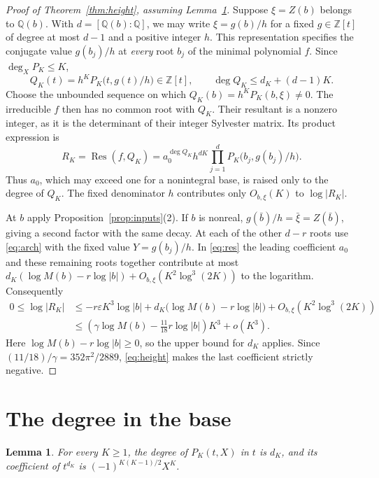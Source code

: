 \documentclass[11pt,letterpaper]{article}
\newtheorem{lemma}[theorem]{Lemma}
\numberwithin{equation}{section}
\newcommand{\Q}{\mathbb Q}
\newcommand{\Z}{\mathbb Z}
\begin{document}
\begin{proof}[Proof of Theorem~\ref{thm:height}, assuming Lemma~\ref{lem:degree}]
Suppose \(\xi=Z(b)\) belongs to \(\Q(b)\). With
\(d=[\Q(b):\Q]\), we may write \(\xi=g(b)/h\) for a fixed
\(g\in\Z[t]\) of degree at most \(d-1\) and a positive integer \(h\).
This representation specifies the conjugate value \(g(b_j)/h\) at
\emph{every} root \(b_j\) of the minimal polynomial \(f\).
Since \(\deg_X P_K\le K\),
\[
 Q_K(t)=h^K P_K\big(t,g(t)/h\big)\in\Z[t],\qquad
 \deg Q_K\le d_K+(d-1)K .
\]
Choose the unbounded sequence on which \(Q_K(b)=h^KP_K(b,\xi)\ne0\).
The irreducible \(f\) then has no common root with \(Q_K\).
Their resultant is a nonzero integer, as it is the determinant of
their integer Sylvester matrix. Its product expression is
\begin{equation}\label{eq:res}
 R_K=\operatorname{Res}(f,Q_K)
     =a_0^{\deg Q_K}h^{dK}\prod_{j=1}^d P_K\big(b_j,g(b_j)/h\big).
\end{equation}
Thus \(a_0\), which may exceed one for a nonintegral base, is raised
only to the degree of \(Q_K\). The fixed denominator \(h\) contributes
only \(O_{b,\xi}(K)\) to \(\log|R_K|\).

At \(b\) apply Proposition~\ref{prop:inputs}(2).
If \(b\) is nonreal, \(g(\bar b)/h=\bar\xi=Z(\bar b)\), giving a
second factor with the same decay. At each of the other \(d-r\)
roots use \eqref{eq:arch} with the fixed value \(Y=g(b_j)/h\).
In \eqref{eq:res} the leading coefficient \(a_0\) and these remaining
roots together contribute at most
\(d_K(\log M(b)-r\log|b|)+O_{b,\xi}(K^2\log^3(2K))\)
to the logarithm. Consequently
\begin{align*}
 0\le\log|R_K|
 &\le -r\varepsilon K^3\log|b|
       +d_K\big(\log M(b)-r\log|b|\big)+O_{b,\xi}(K^2\log^3(2K))\\
 &\le \left(\gamma\log M(b)-\tfrac{11}{18}r\log|b|\right)K^3+o(K^3).
\end{align*}
Here \(\log M(b)-r\log|b|\ge0\), so the upper bound for \(d_K\)
applies. Since \((11/18)/\gamma=352\pi^2/2889\), \eqref{eq:height}
makes the last coefficient strictly negative.
\end{proof}

\section{The degree in the base}\label{sec:degree}

\begin{lemma}\label{lem:degree}
For every \(K\ge1\), the degree of \(P_K(t,X)\) in \(t\) is \(d_K\),
and its coefficient of \(t^{d_K}\) is \((-1)^{K(K-1)/2}X^K\).
\end{lemma}
\end{document}
